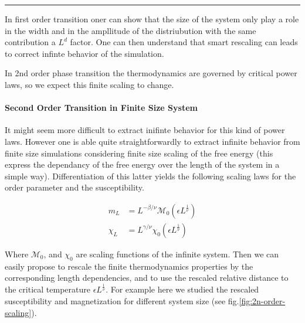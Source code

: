 \documentclass[ansiapaper]{report}
\begin{document}
\par\noindent\rule{\textwidth}{0.4pt}
\begin{multicols}{3}
In first order transition oner can show \cite{Landau} that the size of the system only play a role in the width and in the ampllitude of the distriubution with the same contribution a $L^d$ factor. One can then understand that smart rescaling can leads to correct infinte behavior of the simulation.

In 2nd order phase transition the thermodynamics are governed by critical power laws, so we expect this finite scaling to change. 
\paragraph*{Second Order Transition in Finite Size System}

It might seem more difficult to extract inifinte behavior for this kind of power laws. However one is able quite straightforwardly to extract infinite behavior from finite size simulations considering finite size scaling of the free energy \cite{Landau} (this express the dependancy of the free energy over the length of the system in a simple way). Differentiation of this latter yields the following scaling laws for the order parameter and the susceptibility. 

\begin{align}
    m_L &= L^{-\beta/\nu} \mathcal{M}_0(\epsilon L^{\frac{1}{\nu}})\\
    \chi_L &=L^{\gamma/\nu} \chi_0(\epsilon L^{\frac{1}{\nu}})
\end{align}

Where $\mathcal{M}_0$, and $\chi_0$ are scaling functions of the infinite system. Then we can easily propose to rescale the finite thermodynamics properties by the corresponding length dependencies, and to use the rescaled relative distance to the critical temperature $\epsilon L^{\frac{1}{\nu}}$. For example here we studied the rescaled susceptibility and magnetization for different system size (see fig.\ref{fig:2n-order-scaling}). 


\end{multicols}
\end{document}
